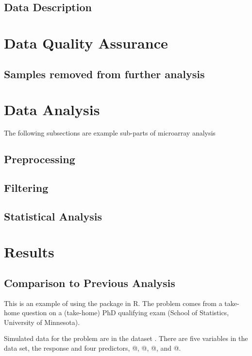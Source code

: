 \documentclass[12pt]{article}
\begin{document}
\subsection{Data Description}

\section{Data Quality Assurance}

\subsection{Samples removed from further analysis}

\section{Data Analysis}

The following subsections are example sub-parts of microarray analysis

\subsection{Preprocessing}
\subsection{Filtering}
\subsection{Statistical Analysis}

\section{Results}

\subsection{Comparison to Previous Analysis}


This is an example of using the \verb@mcmc@ package in R.  The problem comes
from a take-home question on a (take-home) PhD qualifying exam
(School of Statistics, University of Minnesota).

Simulated data for the problem are in the dataset \verb@logit@.
There are five variables in the data set, the response \verb@y@
and four predictors, @, @, @, and @.
\end{document}
